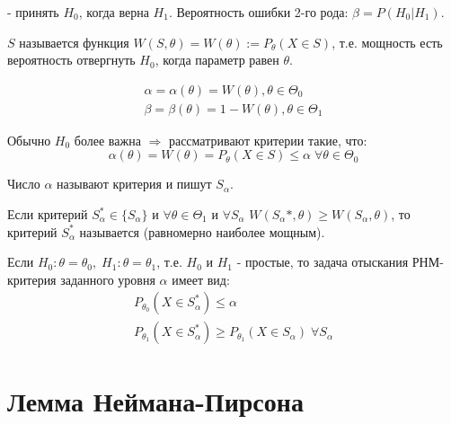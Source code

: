 \begin{definition}\label{lec:4/def:6}
	 - принять $H_0$, когда верна $H_1$. Вероятность ошибки 2-го рода: $\beta = P(H_0 | H_1)$.
\end{definition}

\begin{definition}\label{lec:4/def:7}
	 $S$ называется функция $W (S, \theta) = W (\theta) := P_{\theta} (X \in S)$, т.е. мощность есть вероятность отвергнуть $H_0$, когда параметр равен $\theta$.
\end{definition}

$$\begin{gathered}
	\alpha = \alpha (\theta) = W(\theta), \theta \in \Theta_0 \\
	\beta = \beta (\theta) = 1 - W(\theta), \theta \in \Theta_1
\end{gathered}$$

\begin{remark}\label{lec:4/remark:1}
	Обычно $H_0$ более важна $\Rightarrow$ рассматривают критерии такие, что:
	$$\alpha (\theta) = W (\theta) = P_{\theta} (X \in S) \le \alpha \; \forall \theta \in \Theta_0$$
\end{remark}

\begin{definition}\label{lec:4/def:8}
	Число $\alpha$ называют  критерия и пишут $S_{\alpha}$.
\end{definition}

\begin{definition}\label{lec:4/def:9}
	Если критерий $S_{\alpha}^{*} \in \{S_{\alpha}\}$ и $\forall \theta \in \Theta_1$ и $\forall S_{\alpha}$ $W(S_{\alpha}*, \theta) \ge W(S_{\alpha}, \theta)$, то критерий $S_{\alpha}^{*}$ называется  (равномерно наиболее мощным).
\end{definition}

Если $H_0: \theta = \theta_0, \; H_1: \theta = \theta_1$, т.е. $H_0$ и $H_1$ - простые, то задача отыскания РНМ-критерия заданного уровня $\alpha$ имеет вид:
$$\begin{gathered}
	P_{\theta_0} (X \in S_{\alpha}^{*}) \le \alpha \\
	P_{\theta_1} (X \in S_{\alpha}^{*}) \ge P_{\theta_1} (X \in S_{\alpha}) \; \forall S_{\alpha}
\end{gathered}$$

\section{Лемма Неймана-Пирсона}\label{lec:4/sec:2}

